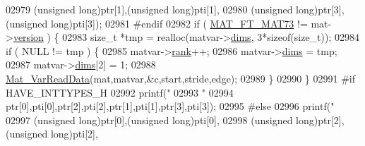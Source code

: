 \begin{DoxyCode}
{{{{{{{{{{{{{{{{{{{{{{{{{{{{{02979                             (\textcolor{keywordtype}{unsigned} \textcolor{keywordtype}{long})ptr[1],(\textcolor{keywordtype}{unsigned} \textcolor{keywordtype}{long})pti[1],
02980                             (\textcolor{keywordtype}{unsigned} \textcolor{keywordtype}{long})ptr[3],(\textcolor{keywordtype}{unsigned} \textcolor{keywordtype}{long})pti[3]);
02981 \textcolor{preprocessor}{#endif}
02982                         \textcolor{keywordflow}{if} ( \hyperlink{group___m_a_t_ggad03442b8378999189d510e3745c702b7a765c5d1d5038947646260dc82483517e}{MAT\_FT\_MAT73} != mat->\hyperlink{struct__mat__t_a729c2bc0afc97485057a5af425635b1a}{version} ) \{
02983                             \textcolor{keywordtype}{size\_t} *tmp = realloc(matvar->\hyperlink{group___m_a_t_a8e01234e1c862ce3472bb37f5a09b92c}{dims}, 3*\textcolor{keyword}{sizeof}(\textcolor{keywordtype}{size\_t}));
02984                             \textcolor{keywordflow}{if} ( NULL != tmp ) \{
02985                                 matvar->\hyperlink{group___m_a_t_a84ba70c96ded13cc555fa75b768d9921}{rank}++;
02986                                 matvar->\hyperlink{group___m_a_t_a8e01234e1c862ce3472bb37f5a09b92c}{dims} = tmp;
02987                                 matvar->\hyperlink{group___m_a_t_a8e01234e1c862ce3472bb37f5a09b92c}{dims}[2] = 1;
02988                                 \hyperlink{group___m_a_t_ga1845000f4fc6252ec5ff11c4b9f0759f}{Mat\_VarReadData}(mat,matvar,&c,start,stride,edge);
02989                             \}
02990                         \}
02991 \textcolor{preprocessor}{#if HAVE\_INTTYPES\_H}
02992                         printf(\textcolor{stringliteral}{"%
02993                             \textcolor{stringliteral}{"%
02994                             ptr[0],pti[0],ptr[2],pti[2],ptr[1],pti[1],ptr[3],pti[3]);
02995 \textcolor{preprocessor}{#else}
02996                         printf(\textcolor{stringliteral}{"%
02997                             (\textcolor{keywordtype}{unsigned} \textcolor{keywordtype}{long})ptr[0],(\textcolor{keywordtype}{unsigned} \textcolor{keywordtype}{long})pti[0],
02998                             (\textcolor{keywordtype}{unsigned} \textcolor{keywordtype}{long})ptr[2],(\textcolor{keywordtype}{unsigned} \textcolor{keywordtype}{long})pti[2],
}}}}}}}}}}}}}}}}}}}}}}}}}}}}}}}}
\end{DoxyCode}
